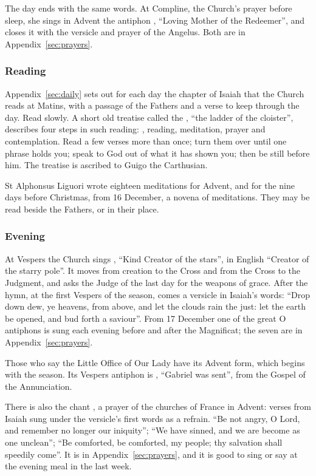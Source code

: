 The day ends with the same words. At Compline, the Church's prayer before
sleep, she sings in Advent the antiphon , ``Loving
Mother of the Redeemer'', and closes it with the versicle and prayer of the
Angelus. Both are in Appendix~\ref{sec:prayers}.

\subsubsection*{Reading}

Appendix~\ref{sec:daily} sets out for each day the chapter of Isaiah that the
Church reads at Matins, with a passage of the Fathers and a verse to keep
through the day. Read slowly. A short old treatise called the , ``the ladder of the cloister'', describes four steps in such
reading: , reading,
meditation, prayer and contemplation. Read a few verses more than once; turn
them over until one phrase holds you; speak to God out of what it has shown
you; then be still before him. The treatise is ascribed to Guigo the
Carthusian.

St Alphonsus Liguori wrote eighteen meditations for Advent, and for the nine
days before Christmas, from 16 December, a novena of meditations. They may be
read beside the Fathers, or in their place.

\subsubsection*{Evening}

At Vespers the Church sings , ``Kind Creator of the
stars'', in English ``Creator of the starry pole''. It moves from creation to
the Cross and from the Cross to the Judgment, and asks the Judge of the last
day for the weapons of grace. After the hymn, at the first Vespers of the
season, comes a versicle in Isaiah's words: ``Drop down dew, ye heavens, from
above, and let the clouds rain the just: let the earth be opened, and bud forth
a saviour''. From 17 December one of the great O antiphons is sung each evening
before and after the Magnificat; the seven are in Appendix~\ref{sec:prayers}.

Those who say the Little Office of Our Lady have its Advent form, which begins
with the season. Its Vespers antiphon is , ``Gabriel
was sent'', from the Gospel of the Annunciation.

There is also the chant , a prayer of the churches of
France in Advent: verses from Isaiah sung under the versicle's first words as a
refrain. ``Be not angry, O Lord, and remember no longer our iniquity''; ``We
have sinned, and we are become as one unclean''; ``Be comforted, be comforted,
my people; thy salvation shall speedily come''. It is in
Appendix~\ref{sec:prayers}, and it is good to sing or say at the evening meal in
the last week.

